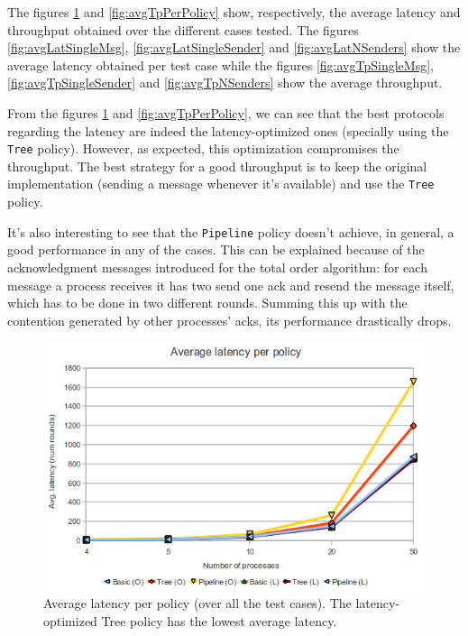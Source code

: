 \documentclass[a4paper, 11pt]{article}
\begin{document}
	The figures \ref{fig:avgLatPerPolicy} and \ref{fig:avgTpPerPolicy} show, respectively, the average latency and throughput obtained over the different cases tested. The figures \ref{fig:avgLatSingleMsg}, \ref{fig:avgLatSingleSender} and \ref{fig:avgLatNSenders} show the average latency obtained per test case while the figures \ref{fig:avgTpSingleMsg}, \ref{fig:avgTpSingleSender} and \ref{fig:avgTpNSenders} show the average throughput.
	
	From the figures \ref{fig:avgLatPerPolicy} and \ref{fig:avgTpPerPolicy}, we can see that the best protocols regarding the latency are indeed the latency-optimized ones (specially using the \texttt{Tree} policy). However, as expected, this optimization compromises the throughput. The best strategy for a good throughput is to keep the original implementation (sending a message whenever it's available) and use the \texttt{Tree} policy.
	
	It's also interesting to see that the \texttt{Pipeline} policy doesn't achieve, in general, a good performance in any of the cases. This can be explained because of the acknowledgment messages introduced for the total order algorithm: for each message a process receives it has two send one ack and resend the message itself, which has to be done in two different rounds. Summing this up with the contention generated by other processes' acks, its performance drastically drops.

\begin{figure}[htp]
  \centering
  \includegraphics[scale=0.6]{avgLatPerPolicy.png}
	\caption{Average latency per policy (over all the test cases). The latency-optimized Tree policy has the lowest average latency.}
  \label{fig:avgLatPerPolicy}
\end{figure}
\end{document}

